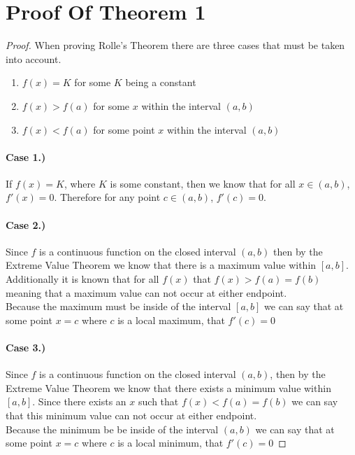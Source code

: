 \documentclass{article}
\theoremstyle{plain}
\theoremstyle{definition}
\begin{document}
\section{Proof Of Theorem 1} \label{sect:lemma}
    \begin{proof}
        When proving Rolle's Theorem there are three cases that must be taken into account. 
        \begin{enumerate}
            \item $f(x) = K$ for some $K$ being a constant
            \item $f(x) > f(a)$ for some $x$ within the interval $(a,b)$
            \item $f(x) < f(a)$ for some point $x$ within the interval $(a,b)$
        \end{enumerate}
        \paragraph{Case 1.)} If $f(x)=K$, where $K$ is some constant, then we know that for all $x \in (a,b)$, $f'(x) = 0$. Therefore for any point $c \in (a,b)$, $f'(c) = 0$.
        \paragraph{Case 2.)} Since $f$ is a continuous function on the closed interval $(a,b)$ then by the Extreme Value Theorem we know that there is a maximum value within $[a,b]$. Additionally it is known that for all $f(x)$ that $f(x)>f(a)=f(b)$ meaning that a maximum value can not occur at either endpoint. \\
        Because the maximum must be inside of the interval $[a,b]$ we can say that at some point $ x = c$ where $c$ is a local maximum, that $f'(c) =0$
        \paragraph{Case 3.)} Since $f$ is a continuous function on the closed interval $(a,b)$, then by the Extreme Value Theorem we know that there exists a minimum value within $[a,b]$. Since there exists an $x$ such that $f(x) < f(a) = f(b)$ we can say that this minimum value can not occur at either endpoint.\\
        Because the minimum be be inside of the interval $(a,b)$ we can say that at some point $x = c$ where $c$ is a local minimum, that $f'(c) = 0$
    \end{proof}
\end{document}
